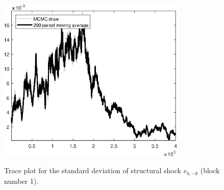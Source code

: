 \begin{figure}[H]
\centering
  \includegraphics[width=0.8\textwidth]{BRS_sectoral/graphs/TracePlot_SE_e_b_news_8_blck_1}\\
    \caption{Trace plot for the standard deviation of structural shock ${e_{b,-8}}$ (block number 1).}
\end{figure}
